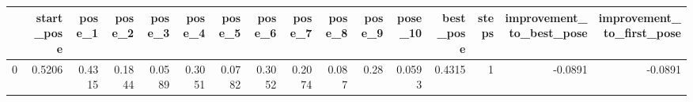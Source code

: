 \begin{tabular}{lrrrrrrrrrrrrrrr}
\toprule
{} &  start\_pose &  pose\_1 &  pose\_2 &  pose\_3 &  pose\_4 &  pose\_5 &  pose\_6 &  pose\_7 &  pose\_8 &  pose\_9 &  pose\_10 &  best\_pose &  steps &  improvement\_to\_best\_pose &  improvement\_to\_first\_pose \\
\midrule
0 &      0.5206 &  0.4315 &  0.1844 &  0.0589 &  0.3051 &  0.0782 &  0.3052 &  0.2074 &   0.087 &    0.28 &   0.0593 &     0.4315 &      1 &                   -0.0891 &                    -0.0891 \\
\bottomrule
\end{tabular}
